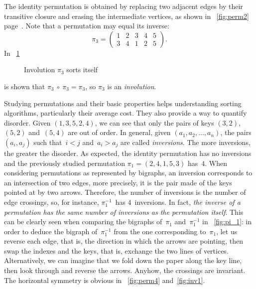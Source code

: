 The identity permutation is obtained by
replacing two adjacent edges by their transitive
closure and erasing the intermediate
vertices, as shown in \fig~\ref{fig:perm2}
page~\pageref{fig:perm2}. Note that a permutation may equal its
inverse:
\begin{equation*}
\pi_3 =
\begin{pmatrix}
1 & 2 & 3 & 4 & 5\\
3 & 4 & 1 & 2 & 5
\end{pmatrix}.
\end{equation*}
In \fig~\ref{fig:involution}
\begin{figure}
\centering
{}
\qquad\qquad
{}
\caption{Involution \(\pi_3\) sorts itself}
\label{fig:involution}
\end{figure}
is shown that \(\pi_3~\circ~\pi_3 = \pi_3\), so \(\pi_3\) is an
\emph{involution}.

Studying permutations and their basic properties helps understanding
sorting algorithms, particularly their average cost. They also provide
a way to quantify disorder. Given \((1,3,5,2,4)\), we can see that
only the pairs of keys \((3,2)\), \((5,2)\) and~\((5,4)\) are out of
order. In general, given \((a_1, a_2, \dots, a_n)\), the pairs
\((a_i,a_j)\) such that~\(i < j\) and~\(a_i > a_j\) are called
\emph{inversions}. The more inversions,
the greater the disorder. As expected, the identity
permutation has no inversions and the
previously studied permutation \(\pi_1 = (2,4,1,5,3)\) has~\(4\). When
considering permutations as represented by
bigraphs, an
inversion corresponds to an intersection
of two edges, more precisely, it is the pair made of the keys pointed
at by two arrows. Therefore, the number of
inversions is the number of edge
crossings, so, for instance, \(\pi_1^{-1}\)~has \(4\)~inversions. In
fact, \emph{the inverse of a permutation
  has the same number of inversions as
  the permutation itself}. This can be clearly seen
when comparing the bigraphs of~\(\pi_1\)
and~\(\pi_1^{-1}\) in \fig~\vref{fig:pi_1}: in order to deduce the
bigraph of~\(\pi_1^{-1}\) from the one corresponding to~\(\pi_1\), let
us reverse each edge, that is, the direction in which the arrows are
pointing, then swap the indexes and the keys, that is, exchange the
two lines of vertices. Alternatively, we can imagine that we fold down
the paper along the key line, then look through and reverse the
arrows. Anyhow, the crossings are invariant. The horizontal symmetry
is obvious in \figs~\ref{fig:perm4} and~\ref{fig:inv1}.

